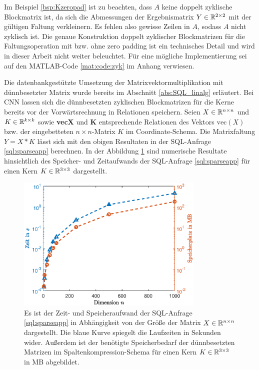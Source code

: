 Im Beispiel \ref{bsp:Kzeropad} ist zu beachten, dass $A$ keine doppelt zyklische Blockmatrix ist, da sich die Abmessungen der Ergebnismatrix $ Y \in \mathbb{R}^{2 \times 2}$ mit der gültigen Faltung verkleinern. Es fehlen also gewisse Zeilen in $A$, sodass $A$ nicht zyklisch ist.
Die genaue Konstruktion doppelt zyklischer Blockmatrizen für die Faltungsoperation mit bzw. ohne zero padding ist ein technisches Detail und wird in dieser Arbeit nicht weiter beleuchtet. Für eine mögliche Implementierung sei auf den MATLAB-Code \ref{mat:code:zyk} im Anhang verwiesen. 

Die datenbankgestützte Umsetzung der Matrixvektormultiplikation mit dünnbesetzter Matrix wurde bereits im Abschnitt \ref{abs:SQL_linalg} erläutert. Bei CNN lassen sich die dünnbesetzten zyklischen Blockmatrizen für die Kerne bereits vor der Vorwärtsrechnung in Relationen speichern. Seien $X \in \mathbb{R}^{n \times n}$ und $K \in \mathbb{R}^{k \times k}$ sowie \textbf{vecX} und \textbf{K} entsprechende Relationen des Vektors $\mathrm{vec}(X)$ bzw. der eingebetteten $n \times n$-Matrix $K$ im Coordinate-Schema. Die Matrixfaltung $Y = X \ast K$ lässt sich mit den obigen Resultaten in der SQL-Anfrage \ref{sql:sparseapp} berechnen. In der Abbildung \ref{abb:sparseapp} sind numerische Resultate hinsichtlich des Speicher- und Zeitaufwands der SQL-Anfrage \ref{sql:sparseapp} für einen Kern $K \in \mathbb{R}^{3 \times 3}$ dargestellt.

\begin{figure}[h]
    \includegraphics[width=0.8\textwidth]{pics/chapters/kap5/data_plot_sparse_ver.eps}
    \centering
    \caption[Laufzeiten und Speicherbedarf der \textit{sparse}-Variante]{Es ist der Zeit- und Speicheraufwand der SQL-Anfrage \ref{sql:sparseapp} in Abhängigkeit von der Größe der Matrix $X \in \mathbb{R}^{n \times n}$ dargestellt. Die blaue Kurve spiegelt die Laufzeiten in Sekunden wider. Außerdem ist der benötigte Speicherbedarf der dünnbesetzten Matrizen im Spaltenkompression-Schema für einen Kern $K \in \mathbb{R}^{3 \times 3}$ in MB abgebildet.}
    \label{abb:sparseapp}
\end{figure}

